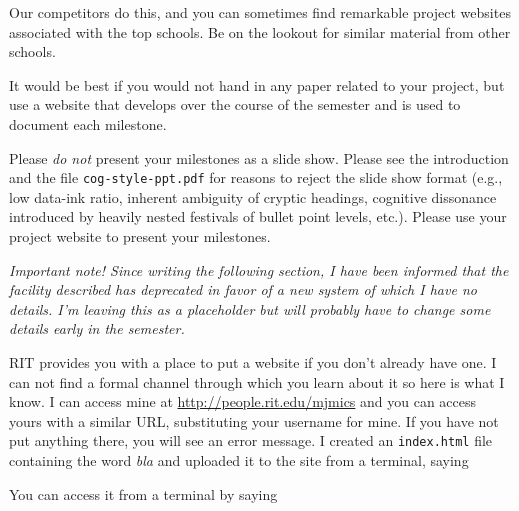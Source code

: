 Our competitors do this, and you can sometimes find remarkable project
websites associated with the top schools. Be on the lookout for similar
material from other schools.

It would be best if you would not hand in any paper related to your
project, but use a website that develops over the course of the semester
and is used to document each milestone.

Please \emph{do not} present your milestones as a slide show. Please see
the introduction and the file \texttt{cog-style-ppt.pdf} for reasons to
reject the slide show format (e.g., low data-ink ratio, inherent
ambiguity of cryptic headings, cognitive dissonance introduced by
heavily nested festivals of bullet point levels, etc.). Please use your
project website to present your milestones.

\hypertarget{create-a-project-website}{%
\label{create-a-project-website}}

\emph{Important note! Since writing the following section, I have been
informed that the facility described has deprecated in favor of a new
system of which I have no details. I'm leaving this as a placeholder but
will probably have to change some details early in the semester.}

RIT provides you with a place to put a website if you don't already have
one. I can not find a formal channel through which you learn about it so
here is what I know. I can access mine at
\url{http://people.rit.edu/mjmics} and you can access yours with a
similar URL, substituting your username for mine. If you have not put
anything there, you will see an error message. I created an
\texttt{index.html} file containing the word \emph{bla} and uploaded it
to the site from a terminal, saying

\begin{Shaded}
\begin{Highlighting}[]
\end{Highlighting}
\end{Shaded}

\noindent You can access it from a terminal by saying

\begin{Shaded}
\begin{Highlighting}[]
\end{Highlighting}
\end{Shaded}

